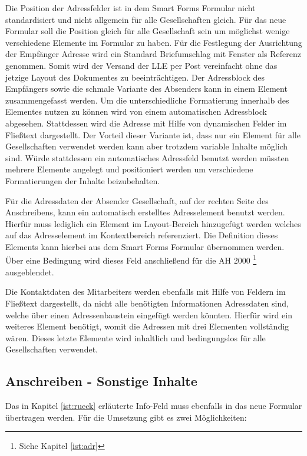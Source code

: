 Die Position der Adressfelder ist in dem Smart Forms Formular nicht standardisiert und nicht allgemein für alle Gesellschaften gleich. Für das neue Formular soll die Position gleich für alle Gesellschaft sein um möglichst wenige verschiedene Elemente im Formular zu haben. Für die Festlegung der Ausrichtung der Empfänger Adresse wird ein Standard Briefumschlag mit Fenster als Referenz genommen. Somit wird der Versand der \ac{LLE} per Post vereinfacht ohne das jetzige Layout des Dokumentes zu beeinträchtigen. Der Adressblock des Empfängers sowie die schmale Variante des Absenders kann in einem Element zusammengefasst werden. Um die unterschiedliche Formatierung innerhalb des Elementes nutzen zu können wird von einem automatischen Adressblock abgesehen. Stattdessen wird die Adresse mit Hilfe von dynamischen Felder im Fließtext dargestellt. Der Vorteil dieser Variante ist, dass nur ein Element für alle Gesellschaften verwendet werden kann aber trotzdem variable Inhalte möglich sind.
 Würde stattdessen ein automatisches Adressfeld benutzt werden müssten mehrere Elemente angelegt und positioniert werden um verschiedene Formatierungen der Inhalte beizubehalten.
 
Für die Adressdaten der Absender Gesellschaft, auf der rechten Seite des Anschreibens, kann ein automatisch erstelltes Adresselement benutzt werden. Hierfür muss lediglich ein Element im Layout-Bereich hinzugefügt werden welches auf das Adresselement im Kontextbereich referenziert. Die Definition dieses Elements kann hierbei aus dem Smart Forms Formular übernommen werden. Über eine Bedingung wird dieses Feld anschließend für die \ac{AH} 2000 \footnote{Siehe Kapitel \ref{ist:adr}} ausgeblendet.

Die Kontaktdaten des Mitarbeiters werden ebenfalls mit Hilfe von Feldern im Fließtext dargestellt, da nicht alle benötigten Informationen Adressdaten sind, welche über einen Adressenbaustein eingefügt werden könnten. Hierfür wird ein weiteres Element benötigt, womit die Adressen mit drei Elementen vollständig wären. Dieses letzte Elemente wird inhaltlich und bedingungslos für alle Gesellschaften verwendet.

\subsection{Anschreiben - Sonstige Inhalte}

Das in Kapitel \ref{ist:rueck} erläuterte Info-Feld muss ebenfalls in das neue Formular übertragen werden. Für die Umsetzung gibt es zwei Möglichkeiten:

